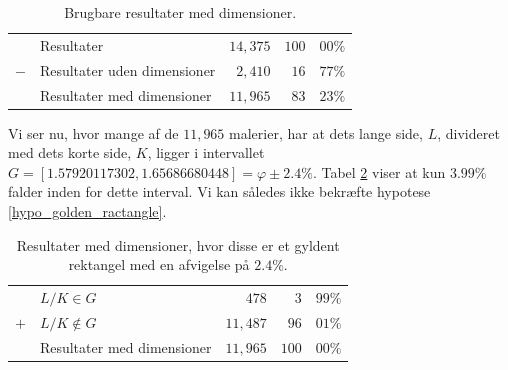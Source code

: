 {\begin{table}[H]
    \centering
    \begin{tabular}{r@{\ \ }p{14em}r|r@{.}l}
            & Resultater                     & $14,375$ & $100$ & $00\%$ \\
        $-$ & Resultater uden dimensioner    &  $2,410$ &  $16$ & $77\%$ \\\hline
            & Resultater med dimensioner     & $11,965$ &  $83$ & $23\%$
    \end{tabular}
    \caption[]{Brugbare resultater med dimensioner.}
    \label{tabel_med_dimensioner}
\end{table}

Vi ser nu, hvor mange af de $11,965$ malerier, har at dets lange side,
$L$, divideret med dets korte side, $K$, ligger i intervallet $G =
[1.57920117302, 1.65686680448] = \varphi \pm 2.4\%$. Tabel
\ref{tabel_real_dimensions} viser at kun $3.99\%$ falder inden for
dette interval. Vi kan således ikke bekræfte hypotese
\ref{hypo_golden_ractangle}.

\begin{table}[H]
    \centering
    \begin{tabular}{r@{\ \ }p{14em}r|r@{.}l}
            & $L/K \in G$                  &    $478$ &   $3$ & $99\%$ \\
        $+$ & $L/K \notin G$               & $11,487$ &  $96$ & $01\%$ \\\hline
            & Resultater med dimensioner   & $11,965$ & $100$ & $00\%$
    \end{tabular}
    \caption[]{Resultater med dimensioner, hvor disse er et gyldent
    rektangel med en afvigelse på $2.4\%$.}
    \label{tabel_real_dimensions}
\end{table}



}
